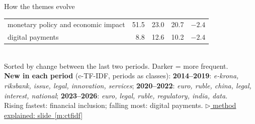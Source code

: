 \documentclass[aspectratio=169,10pt]{beamer}
\newcommand{\method}[1]{\hfill\hyperref[#1]{\tiny\textcolor{c4}{$\triangleright$ method explained: slide~\ref*{#1}}}}
\begin{document}
\begin{frame}{How the themes evolve}
\begin{tabular}{@{}p{}rrrr@{}}
monetary policy and economic impact & \cellcolor{c1!51}51.5 & \cellcolor{c1!23}23.0 & \cellcolor{c1!20}20.7 & \textcolor{c2}{$-2.4$} \\
digital payments & \cellcolor{c1!8}8.8 & \cellcolor{c1!12}12.6 & \cellcolor{c1!10}10.2 & \textcolor{c2}{$-2.4$} \\
\bottomrule\end{tabular}\\[4pt]
Sorted by change between the last two periods. Darker = more frequent.\\[3pt]
\textbf{New in each period} (c-TF-IDF, periods as classes): \textbf{2014--2019}: \emph{e-krona, riksbank, issue, legal, innovation, services}; \textbf{2020--2022}: \emph{euro, ruble, china, legal, interest, national}; \textbf{2023--2026}: \emph{euro, legal, ruble, regulatory, india, data}.\\[2pt]
\small Rising fastest: \alert{financial inclusion}; falling most: \alert{digital payments}.
\method{m:ctfidf}
\end{frame}
\end{document}
